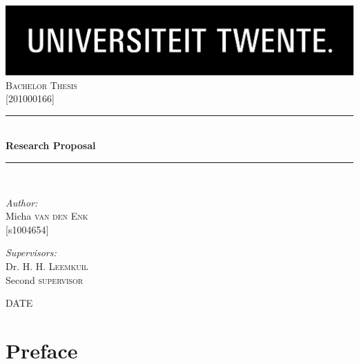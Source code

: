\documentclass[12pt]{report} %
\newcommand{\HRule}{\rule{\linewidth}{0.5mm}}
\begin{document}
\begin{titlepage}

\begin{center}


\includegraphics[width=1\textwidth]{./logo}\\[1cm]    

\textsc{\Large Bachelor Thesis}\\[0.5cm]
\textsc{\Large {[}201000166{]}}\\[0.5cm]


\HRule \\[0.4cm]
{ \huge \bfseries Research Proposal}\\[0.4cm]

\HRule \\[1.5cm]

\begin{minipage}{0.4\textwidth}
\begin{flushleft} \large
\emph{Author:}\\
Micha \textsc{van den Enk} \\
{[}s1004654{]} \\
\end{flushleft}
\end{minipage}
\begin{minipage}{0.4\textwidth}
\begin{flushright} \large
\emph{Supervisors:} \\
Dr. H. H. \textsc{Leemkuil} \\
Second \textsc{supervisor} \\
\end{flushright}
\end{minipage}

\vfill

{\large DATE}

\end{center}

\end{titlepage}

\setcounter{tocdepth}{1}
\tableofcontents

\chapter{Preface}
\end{document}
